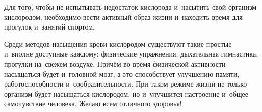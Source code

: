 Для того, чтобы не испытывать недостаток кислорода и~насытить свой организм кислородом, необходимо вести активный образ жизни и~находить время для прогулок и~занятий спортом.

Среди методов насыщения крови кислородом существуют такие простые и~вполне доступные каждому: физические упражнения, дыхательная гимнастика, прогулки на~свежем воздухе. Причём во время физической активности насыщаться будет и~головной мозг, а это способствует улучшению памяти, работоспособности и~сообразительности. При таком режиме жизни не только организм будет насыщаться кислородом, но и~улучшится настроение и~общее самочувствие человека. Желаю всем отличного здоровья!
